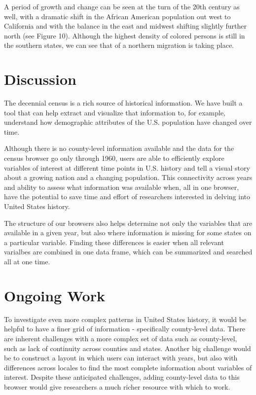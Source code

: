 \documentclass[11pt,]{article}
\begin{document}
A period of growth and change can be seen at the turn of the 20th
century as well, with a dramatic shift in the African American
population out west to California and with the balance in the east and
midwest shifting slightly further north (see Figure 10). Although the
highest density of colored persons is still in the southern states, we
can see that of a northern migration is taking place.

\section{Discussion}

The decennial census is a rich source of historical information. We have
built a tool that can help extract and visualize that information to,
for example, understand how demographic attributes of the U.S.
population have changed over time.

Although there is no county-level information available and the data for
the census browser go only through 1960, users are able to efficiently
explore variables of interest at different time points in U.S. history
and tell a visual story about a growing nation and a changing
population. This connectivity across years and ability to assess what
information was available when, all in one browser, have the potential
to save time and effort of researchers interested in delving into United
States history.

The structure of our browsers also helps determine not only the
variables that are available in a given year, but also where information
is missing for some states on a particular variable. Finding these
differences is easier when all relevant varialbes are combined in one
data frame, which can be summarized and searched all at one time.

\section{Ongoing Work}

To investigate even more complex patterns in United States history, it
would be helpful to have a finer grid of information - specifically
county-level data. There are inherent challenges with a more complex set
of data such as county-level, such as lack of continuity across counties
and states. Another big challenge would be to construct a layout in
which users can interact with years, but also with differences across
locales to find the most complete information about variables of
interest. Despite these anticipated challenges, adding county-level data
to this browser would give researchers a much richer resource with which
to work.
\end{document}
